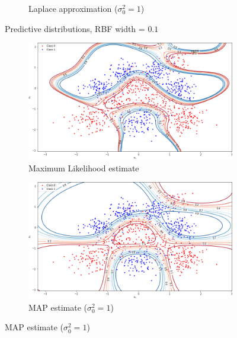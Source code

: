 \documentclass[a4paper]{article}
\begin{document}
\begin{figure}[h]
\begin{subfigure}{0.33\textwidth}
            \caption{Laplace approximation ($\sigma_0^2=1$)}
            \label{fig:predictive-distribution-laplace-width-0.1}
        \end{subfigure}
        \caption{Predictive distributions, RBF width = $0.1$}
        \label{fig:predictive-distributions-width-0.1}
    \end{figure}
\begin{figure}[h]
        \begin{subfigure}{0.33\textwidth}
            \centering
            \includegraphics[width=\textwidth]{plots/bayesian_logistic_classification/predictive_distribution_ML_width_1}
            \caption{Maximum Likelihood estimate}
            \label{fig:predictive-distribution-ml-width-1}
        \end{subfigure}
        \begin{subfigure}{0.33\textwidth}
            \centering
            \includegraphics[width=\textwidth]{plots/bayesian_logistic_classification/predictive_distribution_MAP_width_1_prior_variance_1}
            \caption{MAP estimate ($\sigma_0^2=1$)}
            \label{fig:predictive-distribution-map-width-1}

\end{subfigure}
\end{figure}
\end{document}
